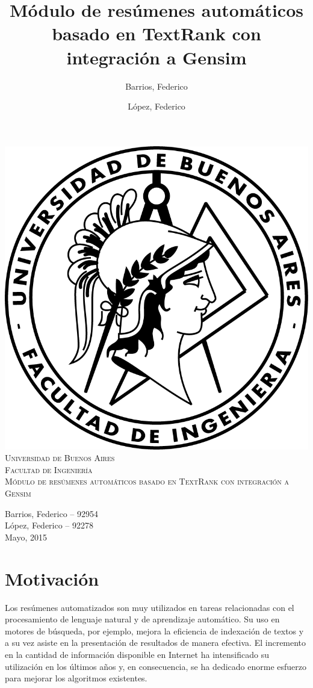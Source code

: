 \documentclass[a4paper]{article}
\title{Módulo de resúmenes automáticos basado en TextRank con integración a Gensim}
\author{Barrios, Federico \and López, Federico}
\begin{document}
\thispagestyle{empty}
\begin{center}
\includegraphics{./logo-fiuba.png}\\
\vspace{1cm}
\textsc{\LARGE Universidad de Buenos Aires}\\[0.3cm]
\textsc{\LARGE Facultad de Ingenier\'ia}\\[1.2cm]
\textsc{\LARGE Módulo de resúmenes automáticos basado en TextRank con integración a Gensim}\\[0.3cm]
\end{center}

\vspace{20 mm}

\begin{flushright}
{\large
Barrios, Federico -- 92954\\
L\'opez, Federico -- 92278\\[0.1cm]
\vspace{2cm}
Mayo, 2015}
\end{flushright}

\pagestyle{fancy}
\newpage

\footnotesize


\newpage
\setcounter{page}{1}
\tableofcontents

\newpage
\section{Motivación}
Los resúmenes automatizados son muy utilizados en tareas relacionadas con el procesamiento de lenguaje natural y de aprendizaje automático. Su uso en motores de búsqueda, por ejemplo, mejora la eficiencia de indexación de textos y a su vez asiste en la presentación de resultados de manera efectiva. El incremento en la cantidad de información disponible en Internet ha intensificado su utilización en los últimos años y, en consecuencia, se ha dedicado enorme esfuerzo para mejorar los algoritmos existentes. 
\end{document}
